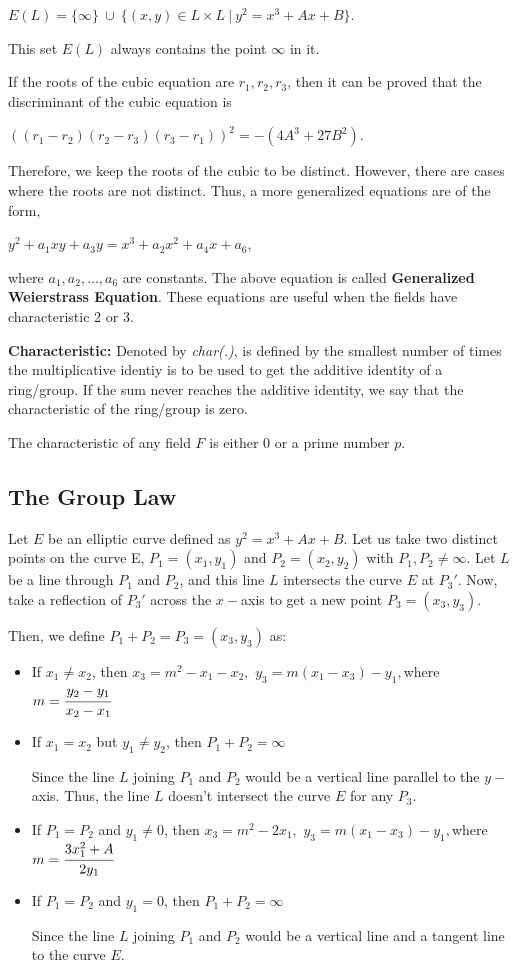 \documentclass[a4paper, 12pt]{article}
\begin{document}
\begin{center}
$E(L) = \{\infty\}\: \cup\: \{(x,y)\in L \times L\:|\:y^2=x^3+Ax+B\}.$
\end{center}
This set $E(L)$ always contains the point $\infty$ in it.\par
If the roots of the cubic equation are $r_1,r_2,r_3$, then it can be proved that the discriminant of the cubic equation is
\begin{center}
$((r_1-r_2)(r_2-r_3)(r_3-r_1))^2=-(4A^3+27B^2).$
\end{center}
Therefore, we keep the roots of the cubic to be distinct. However, there are cases where the roots are not distinct. Thus, a more generalized equations are of the form,
\begin{center}
$y^2+a_1xy+a_3y=x^3+a_2x^2+a_4x+a_6$,
\end{center}
where $a_1,a_2,\dotso,a_6$ are constants. The above equation is called \textbf{Generalized Weierstrass Equation}. These equations are useful when the fields have characteristic 2 or 3.\par
\textbf{Characteristic:} Denoted by \textit{char(.)}, is defined by the smallest number of times the multiplicative identiy is to be used to get the additive identity of a ring/group. If the sum never reaches the additive identity, we say that the characteristic of the ring/group is zero.\par
The characteristic of any field $F$ is either 0 or a prime number $p$.
\subsection{The Group Law}
Let $E$ be an elliptic curve defined as $y^2=x^3+Ax+B$. Let us take two distinct points on the curve E, $P_1=(x_1,y_1)$ and $P_2=(x_2,y_2)$ with $P_1,P_2 \neq \infty$. Let $L$ be a line through $P_1$ and $P_2$, and this line $L$ intersects the curve $E$ at $P_3'$. Now, take a reflection of $P_3'$ across the $x-$axis to get a new point $P_3=(x_3,y_3).$\par
Then, we define $P_1+P_2=P_3=(x_3,y_3)$ as:
\begin{itemize}
	\item If $x_1\neq x_2$, then\newline 
	$x_3=m^2-x_1-x_2,$ \qquad $y_3=m(x_1-x_3)-y_1,$\qquad where $m=\cfrac{y_2-y_1}{x_2-x_1}$
	\item If $x_1=x_2$ but $y_1\neq y_2$, then $P_1+P_2=\infty$\par
	Since the line $L$ joining $P_1$ and $P_2$ would be a vertical line parallel to the $y-$axis. Thus, the line $L$ doesn't intersect the curve $E$ for any $P_3$.
	\item If $P_1=P_2$ and $y_1\neq 0$, then\newline
	$x_3=m^2-2x_1,$ \qquad $y_3=m(x_1-x_3)-y_1,$\qquad where $m=\cfrac{3x_1^2+A}{2y_1}$
	\item If $P_1=P_2$ and $y_1=0$, then $P_1+P_2=\infty$\par
	Since the line $L$ joining $P_1$ and $P_2$ would be a vertical line and a tangent line to the curve $E$.
\end{itemize}
\end{document}
